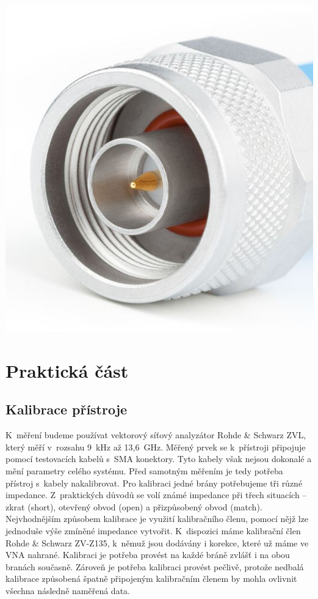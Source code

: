 \documentclass{protokol}
\begin{document}
\begin{center}
\begin{minipage}{0.29\textwidth}
		\includegraphics[width=\textwidth]{connector-n}
		\label{N}
	\end{minipage}
\end{center}

\section{Praktická část}
\subsection{Kalibrace přístroje}
K~měření budeme používat vektorový síťový analyzátor Rohde \& Schwarz ZVL,
který měří v~rozsahu 9~kHz až 13,6~GHz.
Měřený prvek se k~přístroji připojuje pomocí testovacích kabelů s~SMA konektory.
Tyto kabely však nejsou dokonalé a mění parametry celého systému.
Před samotným měřením je tedy potřeba přístroj s~kabely nakalibrovat.
Pro kalibraci jedné brány potřebujeme tři různé impedance.
Z~praktických důvodů se volí známé impedance při třech situacích -- zkrat (short),
otevřený obvod (open) a přizpůsobený obvod (match).
Nejvhodnějším způsobem kalibrace je využití kalibračního členu,
pomocí nějž lze jednoduše výše zmíněné impedance vytvořit.
K~dispozici máme kalibrační člen Rohde \& Schwarz ZV-Z135,
k~němuž jsou dodávány i korekce, které už máme ve VNA nahrané.
Kalibraci je potřeba provést na každé bráně zvlášť i na obou branách současně.
Zároveň je potřeba kalibraci provést pečlivě,
protože nedbalá kalibrace způsobená špatně připojeným kalibračním členem
by mohla ovlivnit všechna následně naměřená data.
\end{document}
